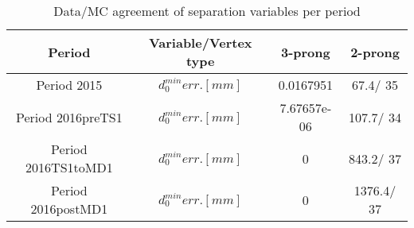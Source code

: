 \documentclass{article}
\begin{document}
\begin{longtable}{c|c|c|c}
\caption{\label{tab:sepVarsandSepPeriods}Data/MC agreement of separation variables per period}\\
Period & Variable/Vertex type & 3-prong & 2-prong\\
\hline
 Period 2015 & $d_{0}^{min} err. [mm]$ & 0.0167951 &  67.4/ 35\\
\hline
 Period 2016preTS1 & $d_{0}^{min} err. [mm]$ & 7.67657e-06 & 107.7/ 34\\
\hline
 Period 2016TS1toMD1 & $d_{0}^{min} err. [mm]$ & 0 & 843.2/ 37\\
\hline
 Period 2016postMD1 & $d_{0}^{min} err. [mm]$ & 0 & 1376.4/ 37\\
\hline
\end{longtable}
\end{document}
